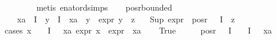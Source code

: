 \begin{isabellebody}
\ \ \ \ \ \ \isamarkupfalse%
\ {\isacharparenleft}{\kern0pt}metis\ enat{\isacharunderscore}{\kern0pt}ord{\isacharunderscore}{\kern0pt}simps{\isacharparenleft}{\kern0pt}{}{\isacharparenright}{\kern0pt}{\isacharparenright}{\kern0pt}\isanewline
\ \ \isamarkupfalse%
\isanewline
{}\isamarkupfalse%
%
\endisatagproof
{\isafoldproof}%
%
\isadelimproof
\isanewline
%
\endisadelimproof
\isanewline
{}\isamarkupfalse%
\ pos{\isacharunderscore}{\kern0pt}r{\isacharunderscore}{\kern0pt}bounded{\isacharcolon}{\kern0pt}\ \isanewline
\ \ \ {\isachardoublequoteopen}xa\ {\isasymin}\ I{\isachardoublequoteclose}\ \ {\isachardoublequoteopen}{\isasymforall}y{\isasymin}{\isasymPhi}\ {\isacharbackquote}{\kern0pt}\ I{\isachardot}{\kern0pt}\ {\isasymPhi}\ xa\ {\isasymnoteq}\ y\ {\isasymlongrightarrow}\ expr{\isacharunderscore}{\kern0pt}{}\ y\ {\isasymle}\ z{\isachardoublequoteclose}\isanewline
\ \ \ {\isachardoublequoteopen}Sup\ {\isacharparenleft}{\kern0pt}expr{\isacharunderscore}{\kern0pt}{}\ {\isacharbackquote}{\kern0pt}\ {\isacharparenleft}{\kern0pt}pos{\isacharunderscore}{\kern0pt}r\ {\isacharparenleft}{\kern0pt}{\isasymPhi}\ {\isacharbackquote}{\kern0pt}\ I{\isacharparenright}{\kern0pt}{\isacharparenright}{\kern0pt}{\isacharparenright}{\kern0pt}\ {\isasymle}\ z{\isachardoublequoteclose}\isanewline
%
\isadelimproof
%
\endisadelimproof
%
\isatagproof
{}\isamarkupfalse%
{\isacharparenleft}{\kern0pt}cases\ {\isachardoublequoteopen}{\isasymforall}x\ {\isasymin}\ {\isacharparenleft}{\kern0pt}{\isasymPhi}\ {\isacharbackquote}{\kern0pt}\ I{\isacharparenright}{\kern0pt}\ {\isacharminus}{\kern0pt}\ {\isacharbraceleft}{\kern0pt}{\isasymPhi}\ xa{\isacharbraceright}{\kern0pt}{\isachardot}{\kern0pt}\ expr{\isacharunderscore}{\kern0pt}{}\ x\ {\isacharless}{\kern0pt}\ expr{\isacharunderscore}{\kern0pt}{}\ {\isacharparenleft}{\kern0pt}{\isasymPhi}\ xa{\isacharparenright}{\kern0pt}{\isachardoublequoteclose}{\isacharparenright}{\kern0pt}\isanewline
\ \ \isamarkupfalse%
\ True\isanewline
\ \ \isamarkupfalse%
\ \isamarkupfalse%
\ {\isachardoublequoteopen}{\isacharparenleft}{\kern0pt}pos{\isacharunderscore}{\kern0pt}r\ {\isacharparenleft}{\kern0pt}{\isasymPhi}\ {\isacharbackquote}{\kern0pt}\ I{\isacharparenright}{\kern0pt}{\isacharparenright}{\kern0pt}\ {\isacharequal}{\kern0pt}\ {\isacharparenleft}{\kern0pt}{\isasymPhi}\ {\isacharbackquote}{\kern0pt}\ I{\isacharparenright}{\kern0pt}\ {\isacharminus}{\kern0pt}\ {\isacharbraceleft}{\kern0pt}{\isasymPhi}\ xa{\isacharbraceright}{\kern0pt}{\isachardoublequoteclose}\isanewline

\end{isabellebody}
